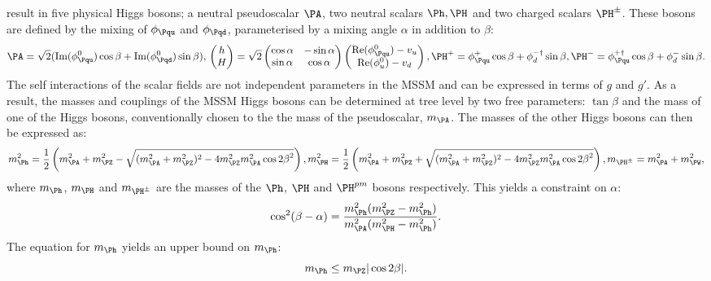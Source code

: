 result in five physical Higgs bosons; a neutral pseudoscalar $\PA$, two neutral
scalars $\Ph,\PH$ and two charged scalars $\PH^{\pm}$. These bosons are defined
by the mixing of $\phi_{\Pqu}$ and $\phi_{\Pqd}$, parameterised by a mixing
angle $\alpha$ in addition to $\beta$:
\begin{equation}
\PA = \sqrt{2}(\text{Im}(\phi_{\Pqu}^{0})\cos\beta +
\text{Im}(\phi_{\Pqd}^{0})\sin\beta), \\ 
\begin{pmatrix} h \\ H \end{pmatrix} = \sqrt{2} 
\begin{pmatrix} \cos\alpha & -\sin\alpha \\ \sin\alpha & \cos\alpha \end{pmatrix}
\begin{pmatrix} \text{Re}(\phi_{\Pqu}^{0}) - v_{u} \\ \text{Re}(\phi_{u}^{0}) -
v_{d}\end{pmatrix}, \\
\PH^{+} = \phi_{\Pqu}^{+} \cos \beta + \phi_{d}^{-\dagger} \sin \beta,\\
\PH^{-} = \phi_{\Pqu}^{+\dagger} \cos \beta + \phi_{d}^{-} \sin \beta.
\end{equation}
The self interactions of the scalar fields are not independent parameters in the
\ac{MSSM} and can be expressed in terms of $g$ and $g'$. As a result, the masses
and couplings of the \ac{MSSM} Higgs bosons can be determined at tree level by
two free parameters: $\tan\beta$ and the mass of one of the Higgs bosons,
conventionally chosen to the the mass of the pseudoscalar, $m_{\PA}$. The masses
of the other Higgs bosons can then be expressed as:
\begin{equation}
m_{\Ph}^{2} = \frac{1}{2} \left( m_{\PA}^{2} + m_{\PZ}^{2} - \sqrt{(m_{\PA}^{2} +
m_{\PZ}^{2})^{2} - 4m_{\PZ}^{2}m_{\PA}^{2}\cos{2\beta}^{2} }\right) , \\
m_{\PH}^{2} = \frac{1}{2} \left( m_{\PA}^{2} + m_{\PZ}^{2} + \sqrt{(m_{\PA}^{2} +
m_{\PZ}^{2})^{2} - 4m_{\PZ}^{2}m_{\PA}^{2}\cos{2\beta}^{2} }\right) , \\
m_{\PH^{\pm}} = m_{\PA}^{2} + m_{\PW}^{2},
\end{equation}
where $m_{\Ph}$, $m_{\PH}$ and $m_{\PH^{\pm}}$ are the masses of the $\Ph$,
$\PH$ and $\PH^{pm}$ bosons respectively. This yields a constraint on $\alpha$:
\begin{equation}
\cos^{2}(\beta-\alpha) = \frac{m_{\Ph}^{2}(m_{\PZ}^{2} -
m_{\Ph}^{2})}{m_{\PA}^{2}(m_{\PH}^{2} - m_{\Ph}^{2}) }.
\end{equation}
The equation for $m_{\Ph}$ yields an upper bound on $m_{\Ph}$:
\begin{equation}
m_{\Ph} \leq m_{\PZ} |\cos{2\beta}|. 
\end{equation}

